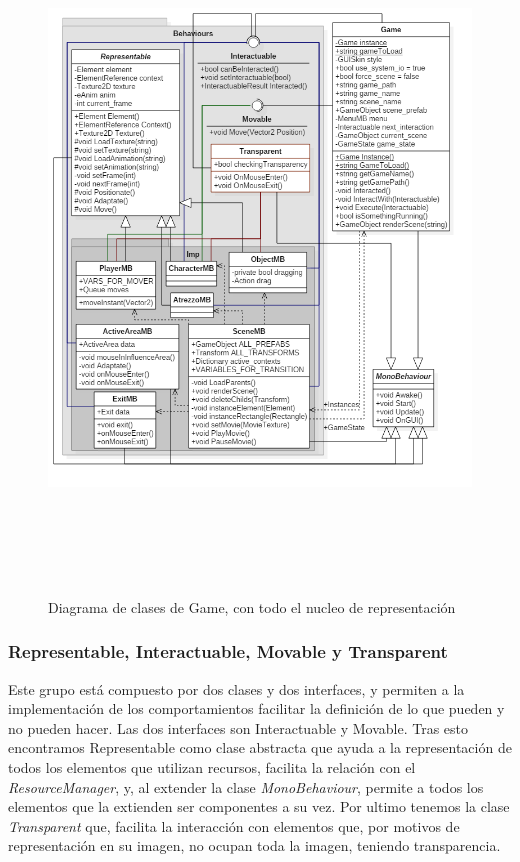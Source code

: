 \begin{figure}[h!]
	\centerline{\includegraphics[height=7.2in]{figures/it2/Game.png}}
	\caption[Game - Versión Final]{Diagrama de clases de Game, con todo el nucleo de representación}
	\label{gameit2}
\end{figure}

\subsubsection{Representable, Interactuable, Movable y Transparent}

Este grupo está compuesto por dos clases y dos interfaces, y permiten a la implementación de los comportamientos facilitar la definición de lo que pueden y no pueden hacer. Las dos interfaces son Interactuable y Movable. Tras esto encontramos Representable como clase abstracta que ayuda a la representación de todos los elementos que utilizan recursos, facilita la relación con el \textit{ResourceManager}, y, al extender la clase \textit{MonoBehaviour}, permite a todos los elementos que la extienden ser componentes a su vez. Por ultimo tenemos la clase \textit{Transparent} que, facilita la interacción con elementos que, por motivos de representación en su imagen, no ocupan toda la imagen, teniendo transparencia.

